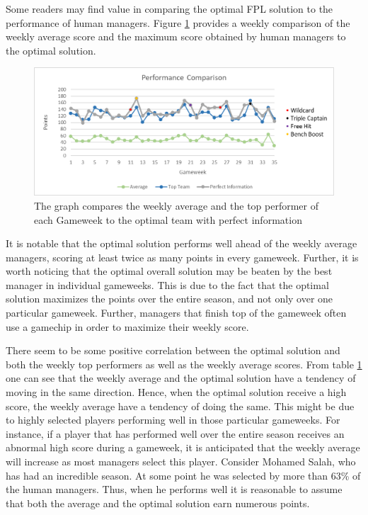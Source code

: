 Some readers may find value in comparing the optimal FPL solution to the performance of human managers. Figure \ref{Figure_Comparison} provides a weekly comparison of the weekly average score and the maximum score obtained by human managers to the optimal solution.

\begin{figure}[H]
\label{fig:Comparison}
    \centering
    \includegraphics[scale=0.75]{fig/chapter_7/Comparison_colour.png}
    \caption{The graph compares the weekly average and the top performer of each Gameweek to the optimal team with perfect information}
\label{Figure_Comparison}    
\end{figure}

 
It is notable that the optimal solution performs well ahead of the weekly average managers, scoring at least twice as many points in every gameweek. Further, it is worth noticing that the optimal overall solution may be beaten by the best manager in individual gameweeks. This is due to the fact that the optimal solution maximizes the points over the entire season, and not only over one particular gameweek. Further, managers that finish top of the gameweek often use a gamechip in order to maximize their weekly score. 

\newpar

There seem to be some positive correlation between the optimal solution and both the weekly top performers as well as the weekly average scores. From table \ref{Figure_Comparison} one can see that the weekly average and the optimal solution have a tendency of moving in the same direction. Hence, when the optimal solution receive a high score, the weekly average have a tendency of doing the same. This might be due to highly selected players performing well in those particular gameweeks. For instance, if a player that has performed well over the entire season receives an abnormal high score during a gameweek, it is anticipated that the weekly average will increase as most managers select this player. Consider Mohamed Salah, who has had an incredible season. At some point he was selected by more than 63\% of the human managers. Thus, when he performs well it is reasonable to assume that both the average and the optimal solution earn numerous points.

